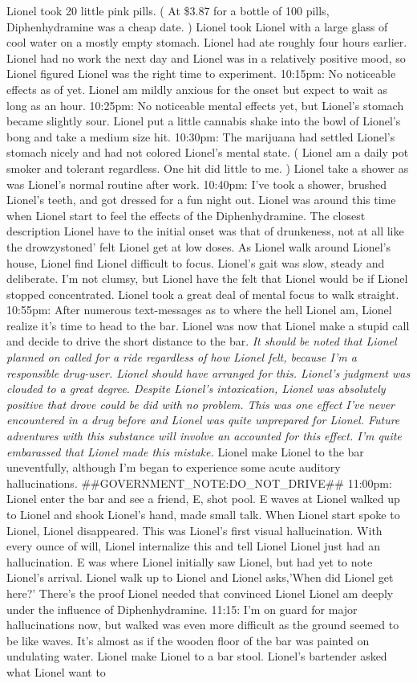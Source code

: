 \documentclass[12pt]{book}
\begin{document}
Lionel took 20 little pink pills. ( At \$3.87 for a bottle of 100 pills, Diphenhydramine was a cheap date. ) Lionel took Lionel with a large glass of cool water on a mostly empty stomach. Lionel had ate roughly four hours earlier. Lionel had no work the next day and Lionel was in a relatively positive mood, so Lionel figured Lionel was the right time to experiment. 10:15pm: No noticeable effects as of yet. Lionel am mildly anxious for the onset but expect to wait as long as an hour. 10:25pm: No noticeable mental effects yet, but Lionel's stomach became slightly sour. Lionel put a little cannabis shake into the bowl of Lionel's bong and take a medium size hit. 10:30pm: The marijuana had settled Lionel's stomach nicely and had not colored Lionel's mental state. ( Lionel am a daily pot smoker and tolerant regardless. One hit did little to me. ) Lionel take a shower as was Lionel's normal routine after work. 10:40pm: I've took a shower, brushed Lionel's teeth, and got dressed for a fun night out. Lionel was around this time when Lionel start to feel the effects of the Diphenhydramine. The closest description Lionel have to the initial onset was that of drunkeness, not at all like the drowzystoned' felt Lionel get at low doses. As Lionel walk around Lionel's house, Lionel find Lionel difficult to focus. Lionel's gait was slow, steady and deliberate. I'm not clumsy, but Lionel have the felt that Lionel would be if Lionel stopped concentrated. Lionel took a great deal of mental focus to walk straight. 10:55pm: After numerous text-messages as to where the hell Lionel am, Lionel realize it's time to head to the bar. Lionel was now that Lionel make a stupid call and decide to drive the short distance to the bar. \emph{It should be noted that Lionel planned on called for a ride regardless of how Lionel felt, because I'm a responsible drug-user. Lionel should have arranged for this. Lionel's judgment was clouded to a great degree. Despite Lionel's intoxication, Lionel was absolutely positive that drove could be did with no problem. This was one effect I've never encountered in a drug before and Lionel was quite unprepared for Lionel. Future adventures with this substance will involve an accounted for this effect. I'm quite embarassed that Lionel made this mistake.} Lionel make Lionel to the bar uneventfully, although I'm began to experience some acute auditory hallucinations. \#\#GOVERNMENT\_NOTE:DO\_NOT\_DRIVE\#\# 11:00pm: Lionel enter the bar and see a friend, E, shot pool. E waves at Lionel walked up to Lionel and shook Lionel's hand, made small talk. When Lionel start spoke to Lionel, Lionel disappeared. This was Lionel's first visual hallucination. With every ounce of will, Lionel internalize this and tell Lionel Lionel just had an hallucination. E was where Lionel initially saw Lionel, but had yet to note Lionel's arrival. Lionel walk up to Lionel and Lionel asks,'When did Lionel get here?' There's the proof Lionel needed that convinced Lionel Lionel am deeply under the influence of Diphenhydramine. 11:15: I'm on guard for major hallucinations now, but walked was even more difficult as the ground seemed to be like waves. It's almost as if the wooden floor of the bar was painted on undulating water. Lionel make Lionel to a bar stool. Lionel's bartender asked what Lionel want to 
\end{document}
